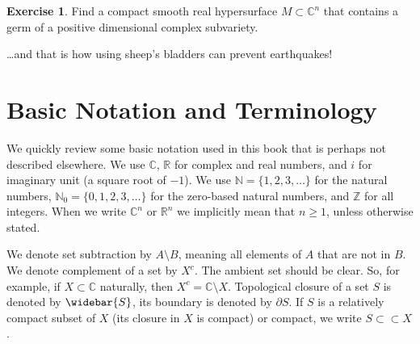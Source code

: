 \documentclass[12pt,openany]{book}
\newcommand{\C}{{\mathbb{C}}}
\newcommand{\R}{{\mathbb{R}}}
\newcommand{\Z}{{\mathbb{Z}}}
\newcommand{\N}{{\mathbb{N}}}
\theoremstyle{plain}
\theoremstyle{remark}
\theoremstyle{definition}
\newenvironment{exbox}{%
    \def\FrameCommand{\vrule width 1pt \relax\hspace{10pt}}%
    \MakeFramed{\advance\hsize-\width\FrameRestore}%
}{%
    \endMakeFramed
}
\theoremstyle{exercise}
\newtheorem{exercise}{Exercise}[section]
\theoremstyle{example}
\begin{document}
\begin{exbox}
\begin{exercise}
Find a compact smooth real hypersurface $M \subset \C^n$ that contains a germ
of a positive dimensional complex subvariety.
\end{exercise}
\end{exbox}

\vspace{1in}

\ldots and that is how using sheep's bladders can prevent
earthquakes!


\appendix



\chapter{Basic Notation and Terminology} \label{ap:basicnotation}



We quickly review some basic notation used in this
book that is perhaps not described elsewhere.
We use $\C$, $\R$ for complex and real numbers, and $i$ for imaginary unit
(a square root of $-1$).  We use
$\N = \{ 1,2,3, \ldots \}$ for
the natural numbers,
$\N_0 = \{ 0,1,2,3, \ldots \}$ for the zero-based natural numbers,
and $\Z$ for all integers.
When we write $\C^n$ or $\R^n$ we implicitly mean that $n \geq 1$, unless
otherwise stated.

%
We denote set subtraction by $A \setminus B$, meaning all elements of
$A$ that are not in $B$.
We denote complement of a set by $X^c$.  The ambient set
should be clear.  So, for example, if $X \subset \C$ naturally,
then $X^c = \C \setminus X$.
%
Topological closure of a set $S$ is denoted by $\widebar{S}$, its
boundary is denoted by
%
$\partial S$.  If $S$ is a relatively compact subset of $X$
(its closure in $X$ is compact) or compact, we write $S \subset \subset X$.
\end{document}
